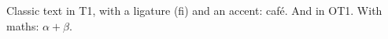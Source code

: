 \documentclass{article}
\begin{document}
Classic text in T1, with a ligature (fi) and an accent: caf\'e.
{\selectfont And in OT1.} With maths: $\alpha + \beta$.
\end{document}
